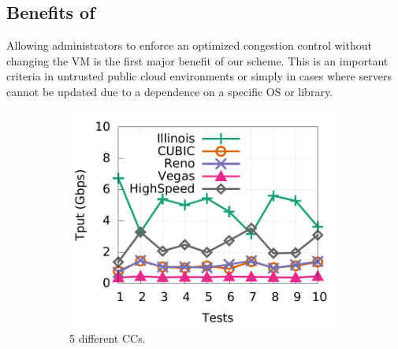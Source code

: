 \subsection{Benefits of~\acdc{}}
Allowing administrators to enforce an optimized congestion control without
changing the VM is the first major benefit of our scheme.
This is an important criteria in untrusted public cloud environments or simply in cases where servers cannot be updated
due to a dependence on a specific OS or library.~\cite{judd2015nsdi}


\begin{figure}[!t]
        \centering
        \begin{subfigure}[b]{0.225\textwidth}
                \centering
		\includegraphics[width=\textwidth]{figures/tput_fairness/default_5CC_tput_detail.pdf}
		\caption{5 different CCs.}
                \label{unfairness_5CC}
        \end{subfigure}
        \begin{subfigure}[b]{0.225\textwidth}
                \centering

\end{subfigure}
\end{figure}
